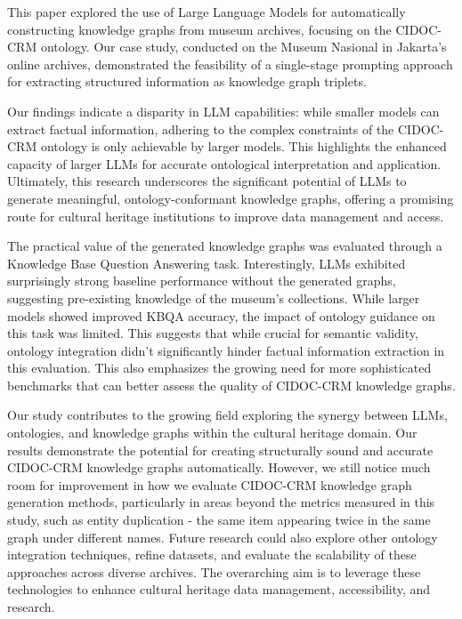 \documentclass[a4, conference]{IEEEtran}
\begin{document}
This paper explored the use of Large Language Models for automatically constructing knowledge graphs from museum archives, focusing on the CIDOC-CRM ontology. Our case study, conducted on the Museum Nasional in Jakarta's online archives, demonstrated the feasibility of a single-stage prompting approach for extracting structured information as knowledge graph triplets.

Our findings indicate a disparity in LLM capabilities: while smaller models can extract factual information, adhering to the complex constraints of the CIDOC-CRM ontology is only achievable by larger models. This highlights the enhanced capacity of larger LLMs for accurate ontological interpretation and application. Ultimately, this research underscores the significant potential of LLMs to generate meaningful, ontology-conformant knowledge graphs, offering a promising route for cultural heritage institutions to improve data management and access.

The practical value of the generated knowledge graphs was evaluated through a Knowledge Base Question Answering task. Interestingly, LLMs exhibited surprisingly strong baseline performance without the generated graphs, suggesting pre-existing knowledge of the museum's collections. While larger models showed improved KBQA accuracy, the impact of ontology guidance on this task was limited. This suggests that while crucial for semantic validity, ontology integration didn't significantly hinder factual information extraction in this evaluation. This also emphasizes the growing need for more sophisticated benchmarks that can better assess the quality of CIDOC-CRM knowledge graphs.

Our study contributes to the growing field exploring the synergy between LLMs, ontologies, and knowledge graphs within the cultural heritage domain. Our results demonstrate the potential for creating structurally sound and accurate CIDOC-CRM knowledge graphs automatically. However, we still notice much room for improvement in how we evaluate CIDOC-CRM knowledge graph generation methods, particularly in areas beyond the metrics measured in this study, such as entity duplication - the same item appearing twice in the same graph under different names. Future research could also explore other ontology integration techniques, refine datasets, and evaluate the scalability of these approaches across diverse archives. The overarching aim is to leverage these technologies to enhance cultural heritage data management, accessibility, and research.




\end{document}
